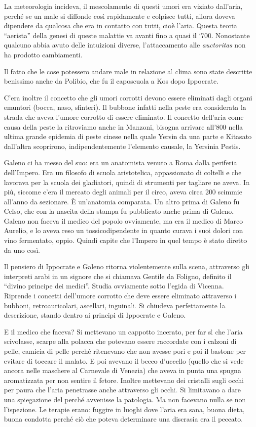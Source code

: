 La meteorologia incideva, il mescolamento di questi umori era viziato
dall'aria, perché se un male si diffonde così rapidamente e colpisce
tutti, allora doveva dipendere da qualcosa che era in contatto con
tutti, cioè l'aria. Questa teoria ``aerista'' della genesi di queste
malattie va avanti fino a quasi il `700. Nonostante qualcuno abbia avuto
delle intuizioni diverse, l'attaccamento alle \emph{auctoritas} non ha
prodotto cambiamenti.

Il fatto che le cose potessero andare male in relazione al clima sono
state descritte benissimo anche da Polibio, che fu il caposcuola a Kos
dopo Ippocrate.

C'era inoltre il concetto che gli umori corrotti devono essere eliminati
dagli organi emuntori (bocca, naso, sfinteri). Il bubbone infatti nella
peste era considerata la strada che aveva l'umore corrotto di essere
eliminato. Il concetto dell'aria come causa della peste la ritroviamo
anche in Manzoni, bisogna arrivare all'800 nella ultima grande epidemia
di peste cinese nella quale Yersin da una parte e Kitasato dall'altra
scoprirono, indipendentemente l'elemento causale, la Yersinia Pestis.

Galeno ci ha messo del suo: era un anatomista venuto a Roma dalla
periferia dell'Impero. Era un filosofo di scuola aristotelica,
appassionato di coltelli e che lavorava per la scuola dei gladiatori,
quindi di strumenti per tagliare ne aveva. In più, siccome c'era il
mercato degli animali per il circo, aveva circa 200 scimmie all'anno da
sezionare. È un'anatomia comparata. Un altro prima di Galeno fu Celso,
che con la nascita della stampa fu pubblicato anche prima di Galeno.
Galeno non faceva il medico del popolo ovviamente, ma era il medico di
Marco Aurelio, e lo aveva reso un tossicodipendente in quanto curava i
suoi dolori con vino fermentato, oppio. Quindi capite che l'Impero in
quel tempo è stato diretto da uno così.

Il pensiero di Ippocrate e Galeno ritorna violentemente sulla scena,
attraverso gli interpreti arabi in un signore che si chiamava Gentile da
Foligno, definito il ``divino principe dei medici''. Studia ovviamente
sotto l'egida di Vicenna. Riprende i concetti dell'umore corrotto che
deve essere eliminato attraverso i bubboni, retroauricolari, ascellari,
inguinali. Si chiudeva perfettamente la descrizione, stando dentro ai
principi di Ippocrate e Galeno.

E il medico che faceva? Si mettevano un cappotto incerato, per far sì
che l'aria scivolasse, scarpe alla polacca che potevano essere
raccordate con i calzoni di pelle, camicia di pelle perché ritenevano
che non avesse pori e poi il bastone per evitare di toccare il malato. E
poi avevano il becco d'uccello (quello che si vede ancora nelle maschere
al Carnevale di Venezia) che aveva in punta una spugna aromatizzata per
non sentire il fetore. Inoltre mettevano dei cristalli sugli occhi per
paura che l'aria penetrasse anche attraverso gli occhi. Si limitavano a
dare una spiegazione del perché avvenisse la patologia. Ma non facevano
nulla se non l'ispezione. Le terapie erano: fuggire in luoghi dove
l'aria era sana, buona dieta, buona condotta perché ciò che poteva
determinare una discrasia era il peccato.

